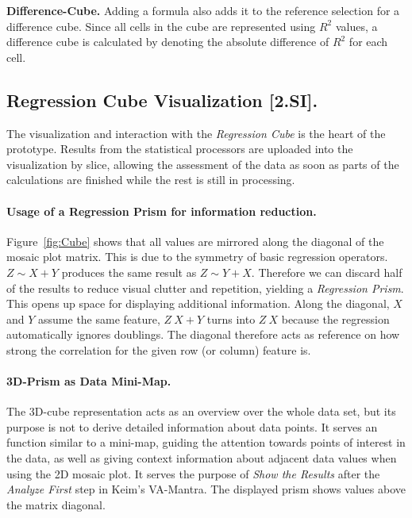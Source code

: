 \documentclass[journal]{style/vgtc} 			          %
\newcommand{\com}[1]{\textcolor{orange}{\uline{#1}}}
\begin{document}
\textbf{Difference-Cube.}
Adding a formula also adds it to the reference selection for a difference cube.
Since all cells in the cube are represented using $R^2$ values, a difference cube is calculated by denoting the absolute difference of $R^2$ for each cell.


\subsection{Regression Cube Visualization [2.SI].}
The visualization and interaction with the \emph{Regression Cube} is the heart of the prototype.
Results from the statistical processors are uploaded into the visualization by slice, allowing the assessment of the data as soon as parts of the calculations are finished while the rest is still in processing.

\paragraph{Usage of a Regression Prism for information reduction.}
Figure~\ref{fig:Cube} shows that all values are mirrored along the diagonal of the mosaic plot matrix.
This is due to the symmetry of basic regression operators.
$Z \sim X + Y$ produces the same result as $Z \sim Y + X$.
Therefore we can discard half of the results to reduce visual clutter and repetition, yielding a \emph{Regression Prism}.
This opens up space for displaying additional information.
Along the diagonal, $X$ and $Y$ assume the same feature, $Z ~ X + Y$ turns into $Z ~ X$ because the regression automatically ignores doublings.
The diagonal therefore acts as reference on how strong the correlation for the given row (or column) feature is.

\paragraph{3D-Prism as Data Mini-Map.}
The 3D-cube representation acts as an overview over the whole data set, but its purpose is not to derive detailed information about data points.
It serves an function similar to a mini-map, guiding the attention towards points of interest in the data, as well as giving context information about adjacent data values when using the 2D mosaic plot.
It serves the purpose of \emph{Show the Results} after the \emph{Analyze First} step in Keim's VA-Mantra.
The displayed prism shows values above the matrix diagonal.
\end{document}
